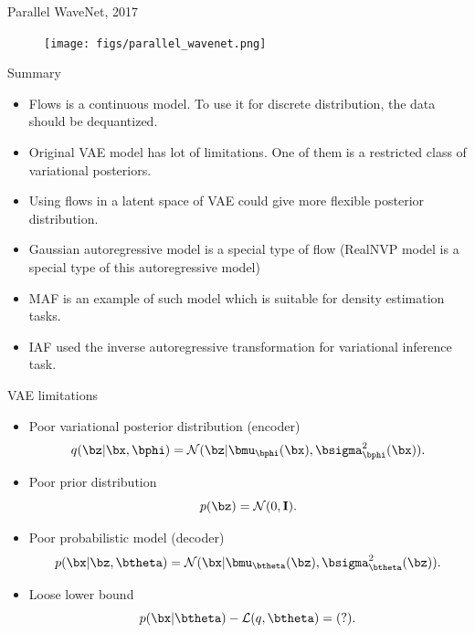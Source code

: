 \begin{frame}{Parallel WaveNet, 2017}
	\begin{figure}
		\centering
		\texttt{[image: figs/parallel\_wavenet.png]}
	\end{figure}

\end{frame}
\begin{frame}{Summary}
	\begin{itemize}
		\item Flows is a continuous model. To use it for discrete distribution, the data should be dequantized.
		\item Original VAE model has lot of limitations. One of them is a restricted class of variational posteriors.
		\item Using flows in a latent space of VAE could give more flexible posterior distribution.
		\item Gaussian autoregressive model is a special type of flow (RealNVP model is a special type of this autoregressive model)
		\item MAF is an example of such model which is suitable for density estimation tasks.
		\item  IAF used the inverse autoregressive transformation for variational inference task.
	\end{itemize}
\end{frame}
\begin{frame}{VAE limitations}
\begin{itemize}
	\item Poor variational posterior distribution (encoder)
	\[
		q(\bz | \bx, \bphi) = \mathcal{N}(\bz| \bmu_{\bphi}(\bx), \bsigma^2_{\bphi}(\bx)).
	\]
	\item Poor prior distribution
	\[
		p(\bz) = \mathcal{N}(0, \mathbf{I}).
	\]
	\item Poor probabilistic model (decoder)
	\[
		p(\bx | \bz, \btheta) = \mathcal{N}(\bx| \bmu_{\btheta}(\bz), \bsigma^2_{\btheta}(\bz)).
	\]
	\item Loose lower bound
	\[
		p(\bx | \btheta) - \mathcal{L}(q, \btheta) = (?).
	\]
\end{itemize}
\end{frame}
